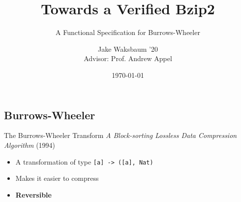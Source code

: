 \documentclass{beamer}
\title{Towards a Verified Bzip2}
\subtitle{A Functional Specification for Burrows-Wheeler}
\date{\today}
\author{Jake Waksbaum '20\\Advisor: Prof. Andrew Appel}
\institute{Princeton University}
\begin{document}
  \maketitle

  \subsection{Burrows-Wheeler}

  \begin{frame}{The Burrows-Wheeler Transform}
    \textit{A Block-sorting Lossless Data Compression Algorithm} (1994)
    \begin{itemize}
    \item<+-> A transformation of type \texttt{[a] -> ([a], Nat)}
    \item<+-> Makes it easier to compress
    \item<+-> \textbf{Reversible}
    \end{itemize}
  \end{frame}
\end{document}
